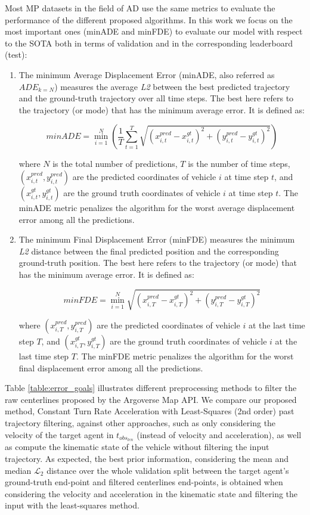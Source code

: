 Most \ac{MP} datasets in the field of \ac{AD} use the same metrics to evaluate the performance of the different proposed algorithms. In this work we focus on the most important ones (\ac{minADE} and \ac{minFDE}) to evaluate our model with respect to the \ac{SOTA} both in terms of validation and in the corresponding leaderboard (test):

\begin{enumerate}
	
	\item The minimum Average Displacement Error (minADE, also referred as $ADE_{k=N}$) measures the average \textit{L2} between the best predicted trajectory and the ground-truth trajectory over all time steps. The best here refers to the trajectory (or mode) that has the minimum average error. It is defined as:
	
	\[
	minADE = \min_{i=1}^{N} \left( \frac{1}{T}\sum_{t=1}^{T}\sqrt{{(x_{i,t}^{pred} - x_{i,t}^{gt})}^2 + {(y_{i,t}^{pred} - y_{i,t}^{gt})}^2} \right)
	\]
	
	where $N$ is the total number of predictions, $T$ is the number of time steps, $(x_{i,t}^{pred}, y_{i,t}^{pred})$ are the predicted coordinates of vehicle $i$ at time step $t$, and $(x_{i,t}^{gt}, y_{i,t}^{gt})$ are the ground truth coordinates of vehicle $i$ at time step $t$. The minADE metric penalizes the algorithm for the worst average displacement error among all the predictions.
	
	\item The minimum Final Displacement Error (minFDE) measures the minimum \textit{L2} distance between the final predicted position and the corresponding ground-truth position. The best here refers to the trajectory (or mode) that has the minimum average error. It is defined as:
	
	\[
	minFDE = \min_{i=1}^{N} \sqrt{{(x_{i,T}^{pred} - x_{i,T}^{gt})}^2 + {(y_{i,T}^{pred} - y_{i,T}^{gt})}^2}
	\]
	
	where $(x_{i,T}^{pred}, y_{i,T}^{pred})$ are the predicted coordinates of vehicle $i$ at the last time step $T$, and $(x_{i,T}^{gt}, y_{i,T}^{gt})$ are the ground truth coordinates of vehicle $i$ at the last time step $T$. The minFDE metric penalizes the algorithm for the worst final displacement error among all the predictions.
	
\end{enumerate}

Table \ref{table:error_goals} illustrates different preprocessing methods to filter the raw centerlines proposed by the Argoverse Map API. We compare our proposed method, Constant Turn Rate Acceleration with Least-Squares (2nd order) past trajectory filtering, against other approaches, such as only considering the velocity of the target agent in $t_{obs_{len}}$ (instead of velocity and acceleration), as well as compute the kinematic state of the vehicle without filtering the input trajectory. As expected, the best prior information, considering the mean and median $\mathcal{L}_2$ distance over the whole validation split between the target agent's ground-truth end-point and filtered centerlines end-points, is obtained when considering the velocity and acceleration in the kinematic state and filtering the input with the least-squares method. 

